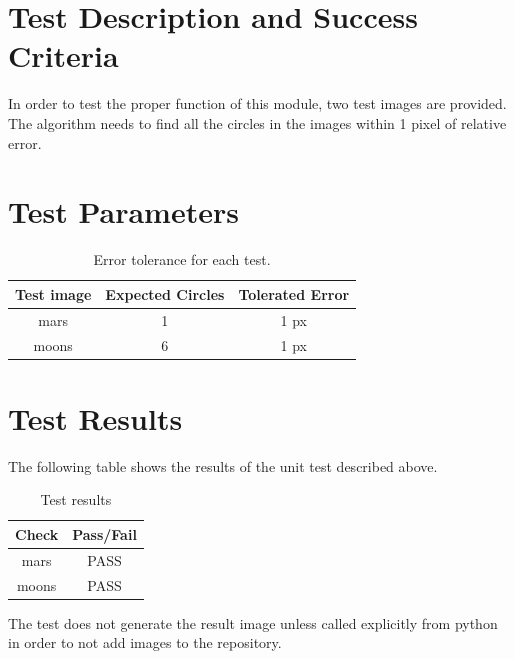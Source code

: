 
\section{Test Description and Success Criteria}
In order to test the proper function of this module, two test images are provided.
The algorithm needs to find all the circles in the images within 1 pixel of relative error.

\section{Test Parameters}

\begin{table}[htbp]
	\caption{Error tolerance for each test.}
	\label{tab:errortol}
	\centering \fontsize{10}{10}\selectfont
	\begin{tabular}{ c | c | c  } %
		\hline\hline
		\textbf{Test image}  & Expected Circles & \textbf{Tolerated Error}  \\  \hline
		mars    & 1 &1 px	   \\ 
		moons        & 6 &1 px   \\ 
		\hline\hline
	\end{tabular}
\end{table}


\section{Test Results}
The following table shows the results of the unit test described above.

\begin{table}[H]
	\caption{Test results}
	\label{tab:results}
	\centering \fontsize{10}{10}\selectfont
	\begin{tabular}{c | c  } %
		\hline\hline
		\textbf{Check} 						  		&\textbf{Pass/Fail} \\ 
		\hline
	   mars   			& PASS \\ 
	   moons   			& PASS  \\
	   \hline\hline
	\end{tabular}
\end{table}

The test does not generate the result image unless called explicitly from python in order to not add images to the repository.

